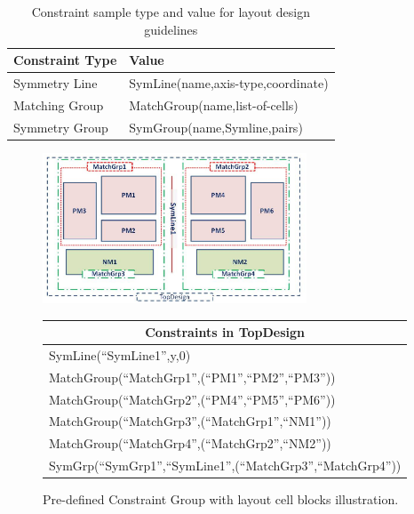     
      \begin{table}[ht]
        \centering
        \caption{Constraint sample type and value for layout design guidelines}\label{tableConType}
        \begin{scriptsize}
          \begin{tabular}[t]{|l|l|}
            \hline
            Constraint Type & Value \\
            \hline
            Symmetry Line & SymLine(name,axis-type,coordinate)  \\
            \hline
            Matching Group  & MatchGroup(name,list-of-cells)  \\
            \hline
            Symmetry Group  & SymGroup(name,Symline,pairs)  \\
            \hline
          \end{tabular}
        \end{scriptsize}
      \end{table}


      \begin{figure}[ht]
        \centering
          \includegraphics[width=0.7\textwidth]{Fig/Chapter3/PreCG.eps}
        \begin{scriptsize}
        \begin{tabular}[t]{l}
          \toprule
          \multicolumn{1}{c}{Constraints in TopDesign}  \\
          \midrule
          SymLine(``SymLine1'',y,0) \\
          MatchGroup(``MatchGrp1'',(``PM1'',``PM2'',``PM3'')) \\
          MatchGroup(``MatchGrp2'',(``PM4'',``PM5'',``PM6'')) \\
          MatchGroup(``MatchGrp3'',(``MatchGrp1'',``NM1'')) \\
          MatchGroup(``MatchGrp4'',(``MatchGrp2'',``NM2'')) \\
          SymGrp(``SymGrp1'',``SymLine1'',(``MatchGrp3'',``MatchGrp4''))  \\
        \bottomrule
        \end{tabular}
        \end{scriptsize}
        \caption{Pre-defined Constraint Group with layout cell blocks illustration.}
        \label{fig:PreCG}
      \end{figure}
    
